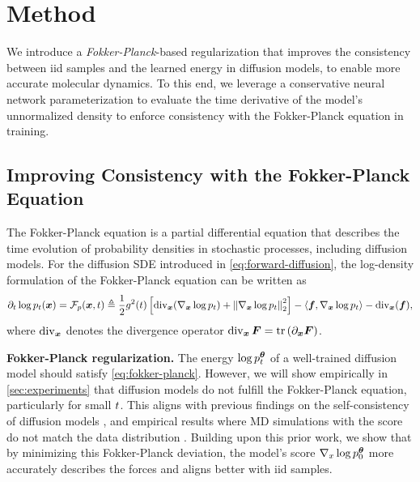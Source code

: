 \section{Method} \label{sec:method}
We introduce a \emph{Fokker-Planck}-based regularization that improves the consistency between iid samples and the learned energy in diffusion models, to enable more accurate molecular dynamics. To this end, we leverage a conservative neural network parameterization to evaluate the time derivative of the model's unnormalized density to enforce consistency with the Fokker-Planck equation in training. 

\subsection{Improving Consistency with the Fokker-Planck Equation}
The Fokker-Planck equation \citep{oksendal2003, saarka2019} is a partial differential equation that describes the time evolution of probability densities in stochastic processes, including diffusion models. For the diffusion \gls{SDE} introduced in \cref{eq:forward-diffusion}, the log-density formulation of the Fokker-Planck equation \citep{lai2023, hu2024scorebased} can be written as
\begin{equation}
    \partial_t \log p_{t}({{\bm{x}}}) = {\mathcal{F}}_p({{\bm{x}}}, {t}) \triangleq \frac{1}{2} {g}^2({t}) \left[ \operatorname{div}_{{\bm{x}}} (\nabla_{{\bm{x}}} \log p_{t}) + \left\Vert \nabla_{{\bm{x}}} \log p_{t} \right\Vert^2_2 \right] - \langle {\bm{f}}, \nabla_{{\bm{x}}} \log p_{t} \rangle - \operatorname{div}_{{\bm{x}}} ({\bm{f}}),
    \label{eq:fokker-planck}
\end{equation}
where $\operatorname{div}_{{\bm{x}}}$ denotes the divergence operator $\operatorname{div}_{{\bm{x}}} {\bm{F}} = \mathrm{tr}\left( \partial_{{\bm{x}}} {\bm{F}} \right)$.

\textbf{Fokker-Planck regularization.} The energy $\log p^{\bm{\theta}}_{t}$ of a well-trained diffusion model should satisfy \cref{eq:fokker-planck}. However, we will show empirically in \cref{sec:experiments} that diffusion models do not fulfill the Fokker-Planck equation, particularly for small ${t}$. 
This aligns with previous findings on the self-consistency of diffusion models \citep{koehler2023statistical, lai2023, li2023generalization}, and empirical results where \gls{MD} simulations with the score do not match the data distribution \citep{arts2023}. 
Building upon this prior work, we show that by minimizing this Fokker-Planck deviation, the model's score $\nabla_x \log p^{\bm{\theta}}_0$ more accurately describes the forces and aligns better with iid samples.

